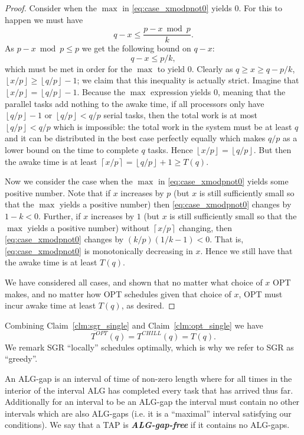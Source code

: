 \documentclass[twocolumn]{article}[10pt]
\newcommand{\defn}[1]{{\textit{\textbf{\boldmath #1}}}\xspace}
\newcommand{\floor}[1]{\left\lfloor #1 \right\rfloor}
\newcommand{\ceil}[1]{\left\lceil #1 \right\rceil}
\begin{document}
\begin{proof}
  Consider when the $\max$ in \eqref{eq:case_xmodpnot0} yields $0$. 
  For this to happen we must have
  $$q-x \le \frac{p-x\bmod p}{k}.$$
  As $p-x\bmod p \le p$ we get the following bound on $q-x$:
  $$q-x \le p/k,$$
  which must be met in order for the $\max$ to yield $0$.
  Clearly as $q \ge x \ge q-p/k$, $\floor{x/p} \ge \floor{q/p}-1$; we
  claim that this inequality is actually strict. Imagine that
  $\floor{x/p} = \floor{q/p}-1$. Because the $\max$ expression
  yields $0$, meaning that the parallel tasks add nothing to the
  awake time, if all processors only have $\floor{q/p}-1$ or
  $\floor{q/p} < q/p$ serial tasks, then the total work is at
  most $\floor{q/p} < q/p$ which is impossible: the total work in
  the system must be at least $q$ and it can be distributed in
  the best case perfectly equally which makes $q/p$ as a lower
  bound on the time to complete $q$ tasks. Hence $\floor{x/p} = \floor{q/p}$. 
  But then the awake time is at least $\ceil{x/p} = \floor{q/p} + 1 \ge T(q)$.

  Now we consider the case when the $\max$ in
  \eqref{eq:case_xmodpnot0} yields some positive number.
  Note that if $x$ increases by $p$ (but $x$ is still
  sufficiently small so that the $\max$ yields a positive number)
  then \eqref{eq:case_xmodpnot0} changes by $1-k < 0$.
  Further, if $x$ increases by $1$ (but $x$ is still
  sufficiently small so that the $\max$ yields a positive number) without $\ceil{x/p}$
  changing, then \eqref{eq:case_xmodpnot0} changes by $(k/p)(1/k
  -1) < 0$. That is, \eqref{eq:case_xmodpnot0} is monotonically
  decreasing in $x$. Hence we still have that the awake time is at least $T(q).$

  We have considered all cases, and shown that no matter what
  choice of $x$ OPT makes, and no matter how OPT schedules given
  that choice of $x$, OPT must incur awake time at least $T(q)$,
  as desired.
\end{proof}

Combining Claim~\ref{clm:sgr_single} and
Claim~\ref{clm:opt_single} we have
\begin{equation}
  \label{eq:same_single}
  T^{OPT}(q) = T^{CHILL}(q) = T(q).
\end{equation}
We remark SGR \enquote{locally} schedules optimally, which is
why we refer to SGR as \enquote{greedy}. 

An ALG-gap is an interval of time of non-zero length where for
all times in the interior of the interval ALG has completed every
task that has arrived thus far. Additionally for an interval to
be an ALG-gap the interval must contain no other intervals which
are also ALG-gaps (i.e. it is a \enquote{maximal} interval
satisfying our conditions).
We say that a TAP is \defn{ALG-gap-free} if it contains no ALG-gaps.
\end{document}
